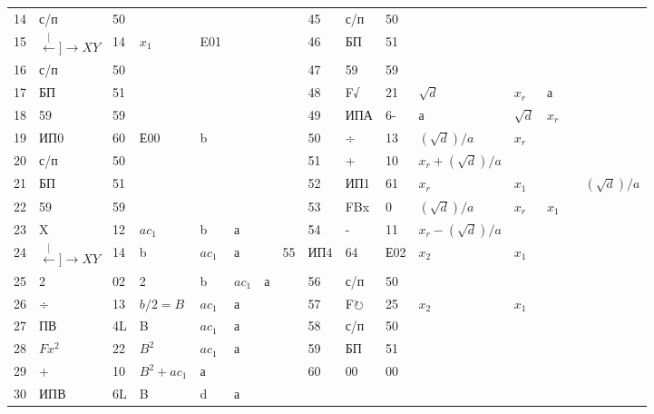\documentclass[11pt,a4paper,oneside]{article}
\def\XY{$\stackrel[\leftarrow]{\rightarrow}{XY}$}
\def\FO{F$\circlearrowright$}
\begin{document}
\begin{table}[H]
\begin{tabular}{|l|l|l|l|l|l|l|l|l|l|l|l|l|l|l|l|}
14    & с/п     & 50  &        &     &     &   &    & 45    & с/п & 50  &      &     &    &   &        \\
15    & \XY      & 14  & $x_{1}$  & E01 &     &   & & 46    & БП  & 51  &      &     &    &   &        \\
16    & с/п     & 50  &        &     &     &   &    & 47    & 59  & 59  &      &     &    &   &        \\
17    & БП      & 51  &        &     &     &   &    & 48    & F√  & 21  & $\sqrt{d}$   & $x_{r}$  & а  &   &        \\
18    & 59      & 59  &        &     &     &   &    & 49    & ИПА & 6-  & а    & $\sqrt{d}$  & $x_{r}$ &   &        \\
19    & ИП0     & 60  & Е00    & b   &     &   &    & 50    & ÷   & 13  & $(\sqrt{d})/a$  & $x_{r}$  &    &   &        \\
20    & с/п     & 50  &        &     &     &   &    & 51    & +   & 10  & $x_{r}+(\sqrt{d})/a$  &     &    &   &        \\
21    & БП      & 51  &        &     &     &   &    & 52    & ИП1 & 61  & $x_{r}$   & $x_{1}$  &    &   & $(\sqrt{d})/a$ \\
22    & 59      & 59  &        &     &     &   &    & 53    & FBx & 0   & $(\sqrt{d})/a$  & $x_{r}$  & $x_{1}$ &   &        \\
23    & X       & 12  & $ac_{1}$ & b   & а   &   &  & 54    & -   & 11  & $x_{r}-(\sqrt{d})/a$ &     &    &   &        \\
24    & \XY      & 14  & b      & $ac_{1}$& а   &   & 55    & ИП4 & 64  & Е02  & $x_{2}$  & $x_{1}$ &   &        \\
25    & 2       & 02  & 2      & b   & $ac_{1}$& а && 56    & с/п & 50  &      &     &    &   &        \\
26    & ÷       & 13  & $b/2=B$  & $ac_{1}$ & а & & & 57    & \FO & 25  & $x_{2}$   & $x_{1}$  &    &   &        \\
27    & ПВ      & 4L  & B      & $ac_{1}$ & а   & & & 58    & с/п & 50  &      &     &    &   &        \\
28    & $Fx^{2}$  & 22 & $B^{2}$ & $ac_{1}$ & а & & & 59    & БП  & 51  &      &     &    &   &        \\
29    & +       & 10  & $B^{2}+ac_{1}$ & а   &&  &  & 60    & 00  & 00  &      &     &    &   &        \\
30    & ИПВ     & 6L  & B      & d   & а   &   &    &       &     &     &      &     &    &   &       
\end{tabular}
\end{table}
\end{document}
